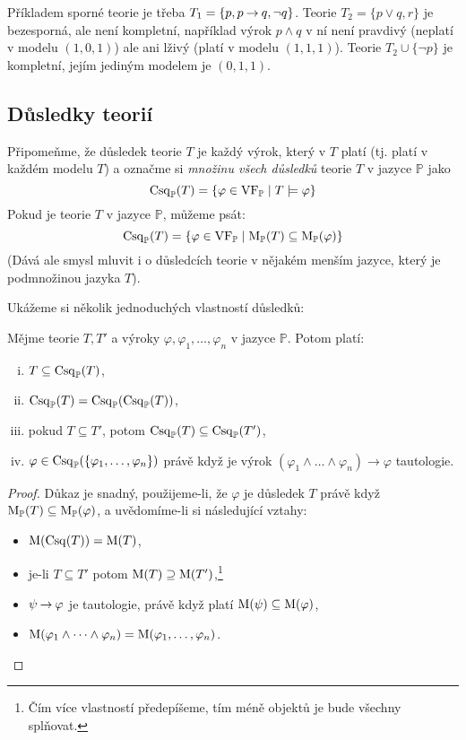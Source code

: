 \begin{example}
    Příkladem sporné teorie je třeba $T_1=\{p,p\mathbin{\rightarrow} q,\neg q\}$. Teorie $T_2=\{p\lor q,r\}$ je bezesporná, ale není kompletní, například výrok $p\land q$ v ní není pravdivý (neplatí v modelu $(1,0,1)$) ale ani lživý (platí v modelu $(1,1,1)$). Teorie $T_2\cup\{\neg p\}$ je kompletní, jejím jediným modelem je $(0,1,1)$.
\end{example}

\subsection{Důsledky teorií}

Připomeňme, že důsledek teorie $T$ je každý výrok, který v $T$ platí (tj. platí v každém modelu $T$) a označme si \emph{množinu všech důsledků} teorie $T$ v jazyce $\mathbb P$ jako
$$
\operatorname{Csq}_\mathbb P(T)=\{\varphi\in\operatorname{VF}_\mathbb P\mid T\models \varphi\}
$$
Pokud je teorie $T$ v jazyce $\mathbb P$, můžeme psát:
$$
\operatorname{Csq}_\mathbb P(T)=\{\varphi\in\operatorname{VF}_\mathbb P\mid \operatorname{M}_\mathbb P(T)\subseteq \operatorname{M}_\mathbb P(\varphi)\}
$$
(Dává ale smysl mluvit i o důsledcích teorie v nějakém menším jazyce, který je podmnožinou jazyka $T$).

Ukážeme si několik jednoduchých vlastností důsledků:
\begin{proposition}\label{proposition:properties-of-consequences}
    Mějme teorie $T,T'$ a výroky $\varphi,\varphi_1,\dots,\varphi_n$ v jazyce $\mathbb P$. Potom platí:
    \begin{enumerate}[(i)]
        \item $T\subseteq\operatorname{Csq}_\mathbb P(T)$,
        \item $\operatorname{Csq}_\mathbb P(T)=\operatorname{Csq}_\mathbb P(\operatorname{Csq}_\mathbb P(T))$,
        \item pokud $T\subseteq T'$, potom $\operatorname{Csq}_\mathbb P(T)\subseteq\operatorname{Csq}_\mathbb P(T')$,
        \item $\varphi\in\operatorname{Csq}_\mathbb P(\{\varphi_1,\dots,\varphi_n\})$ právě když je výrok $(\varphi_1\land \dots\land\varphi_n)\to\varphi$ tautologie.
    \end{enumerate}
\end{proposition}

\begin{proof}
    Důkaz je snadný, použijeme-li, že $\varphi$ je důsledek $T$ právě když $\operatorname{M}_\mathbb P(T)\subseteq \operatorname{M}_\mathbb P(\varphi)$, a uvědomíme-li si následující vztahy:
    \begin{itemize}
        \item $\operatorname{M}(\operatorname{Csq}(T))=\operatorname{M}(T)$,
        \item je-li $T\subseteq T'$ potom $\operatorname{M}(T)\supseteq\operatorname{M}(T')$,\footnote{Čím více vlastností předepíšeme, tím méně objektů je bude všechny splňovat.}
        \item $\psi\mathbin{\rightarrow}\varphi$ je tautologie, právě když platí $\operatorname{M}(\psi)\subseteq\operatorname{M}(\varphi)$,
        \item $\operatorname{M}(\varphi_1\land \dots\land\varphi_n)=\operatorname{M}(\varphi_1,\dots,\varphi_n)$.
    \end{itemize}
\end{proof}

